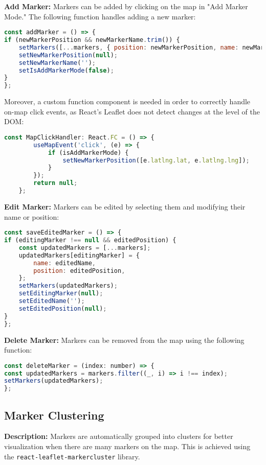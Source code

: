 \documentclass[11pt]{article}
\begin{document}
    \textbf{Add Marker:}
    Markers can be added by clicking on the map in "Add Marker Mode." The following function handles adding a new marker:
    \begin{lstlisting}[language=javascript]
const addMarker = () => {
if (newMarkerPosition && newMarkerName.trim()) {
    setMarkers([...markers, { position: newMarkerPosition, name: newMarkerName }]);
    setNewMarkerPosition(null);
    setNewMarkerName('');
    setIsAddMarkerMode(false);
}
};
    \end{lstlisting}

    Moreover, a custom function component is needed in order to correctly handle on-map click events, as React's Leaflet does not detect changes at the level of the DOM:
    \begin{lstlisting}[language=javascript]
const MapClickHandler: React.FC = () => {
        useMapEvent('click', (e) => {
            if (isAddMarkerMode) {
                setNewMarkerPosition([e.latlng.lat, e.latlng.lng]);
            }
        });
        return null;
    };
    \end{lstlisting}

    \textbf{Edit Marker:}
    Markers can be edited by selecting them and modifying their name or position:
    \begin{lstlisting}[language=javascript]
const saveEditedMarker = () => {
if (editingMarker !== null && editedPosition) {
    const updatedMarkers = [...markers];
    updatedMarkers[editingMarker] = {
        name: editedName,
        position: editedPosition,
    };
    setMarkers(updatedMarkers);
    setEditingMarker(null);
    setEditedName('');
    setEditedPosition(null);
}
};
    \end{lstlisting}

    \textbf{Delete Marker:}
    Markers can be removed from the map using the following function:
    \begin{lstlisting}[language=javascript]
const deleteMarker = (index: number) => {
const updatedMarkers = markers.filter((_, i) => i !== index);
setMarkers(updatedMarkers);
};
    \end{lstlisting}

    \subsection{Marker Clustering}
    \textbf{Description:} Markers are automatically grouped into clusters for better visualization when there are many markers on the map. This is achieved using the \texttt{react-leaflet-markercluster} library.
\end{document}
